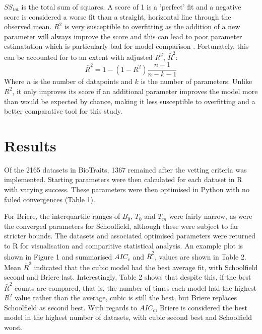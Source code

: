 \documentclass[twoside,twocolumn,11pt]{article}
\begin{document}
$SS_{tot}$ is the total sum of squares. A score 
of 1 is a 'perfect' fit and a negative score is considered a worse fit than a straight, horizontal line through the 
observed mean. $R^2$ is very susceptible to overfitting as the addition of a new parameter will always 
improve the score and this can lead to poor parameter estimatation which is particularly bad for model comparison
\citep{Johnson2004}. Fortunately, this can be accounted for to an extent with adjusted $R^2$, $\bar{R}^2$:
\begin{equation}
  \bar{R}^2 = 1 - (1-R^2) \frac{n-1}{n-k-1}
\end{equation}
Where $n$ is the number of datapoints and $k$ is the number of parameters. Unlike $R^2$, it only improves its 
score if an additional parameter improves the model more than would be expected by chance, making it less susceptible 
to overfitting and a better comparative tool for this study.


\section{Results}
Of the 2165 datasets in BioTraits, 1367 remained after the vetting criteria
was implemented. 
Starting parameters were then calculated for each dataset in R with varying success.
These parameters were then optimised in Python with no failed convergences (Table 1).

For Briere, the interquartile ranges of $B_0$, $T_0$ and $T_m$ were fairly narrow, as were 
the converged parameters for Schoolfield, although these were subject to far stricter bounds.
The datasets and associated optimised parameters were returned to R for visualisation and 
comparitive statistical analysis. An example plot is shown in Figure 1 and summarised $AIC_c$ and $\bar{R}^2$, 
values are shown in Table 2.
Mean $\bar{R}^2$ indicated that the cubic model had the best average fit, with Schoolfield second and
Briere last. Interestingly, Table 2 shows that despite this, if the best $\bar{R}^2$ counts are compared,
that is, the number of times each model had the highest $R^2$ value rather than the average,
cubic is still the best, but Briere replaces Schoolfield as second best.
With regards to $AIC_c$, Briere is considered the best model in the highest number of datasets, 
with cubic second best and Schoolfield worst.

\end{document}
